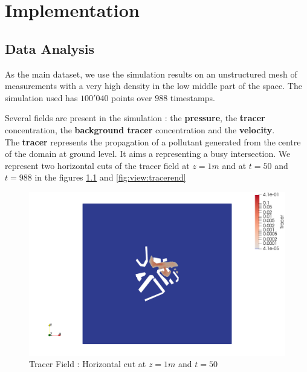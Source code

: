\chapter{Implementation}


\section{Data Analysis}

As the main dataset, we use the simulation results on an unstructured mesh of measurements with a very high density in the low middle part of the space. The simulation used has $100'040$ points over $988$ timestamps. 


 Several fields are present in the simulation : the \textbf{pressure}, the \textbf{tracer} concentration, the \textbf{background tracer} concentration and the \textbf{velocity}. \\ 

The \textbf{tracer} represents the propagation of a pollutant generated from the centre of the domain at ground level. It aims a representing a busy intersection. We represent two horizontal cuts of the tracer field at $z=1m$ and at $t=50$ and $t=988$ in the figures \ref{fig:view:tracerstart} and \ref{fig:view:tracerend}\\


\begin{figure}[h!]
\centering
  \includegraphics[width=0.9\linewidth]{figures/Analysis/tracer050cutZ1}
  \caption{Tracer Field : Horizontal cut at $z=1m$ and $t=50$  }
  \label{fig:view:tracerstart}
\end{figure}


